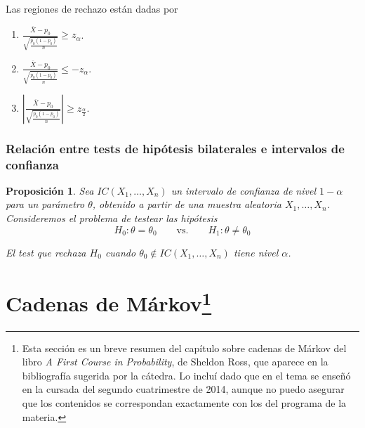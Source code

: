 \documentclass[11pt]{article}
\theoremstyle{plain}
\newtheorem*{pro}{Proposición}
\theoremstyle{definition}
\theoremstyle{remark}
\renewcommand{\arraystretch}{2}
\begin{document}
        Las regiones de rechazo están dadas por
        \begin{enumerate}
          \item $\displaystyle \frac{\overline{X} - p_0}{\sqrt{\frac{p_0 (1 - p_0)}{n}}} \geq z_\alpha$.
          \item $\displaystyle \frac{\overline{X} - p_0}{\sqrt{\frac{p_0 (1 - p_0)}{n}}} \leq - z_\alpha$.
          \item $\displaystyle \left| \frac{\overline{X} - p_0}{\sqrt{\frac{p_0 (1 - p_0)}{n}}} \right| \geq z_\frac{\alpha}{2}$.
        \end{enumerate}

      \subsubsection{Relación entre tests de hipótesis bilaterales e intervalos de confianza}

        \begin{pro}
          Sea $IC(X_1,\dots,X_n)$ un intervalo de confianza de nivel $1 - \alpha$ para un parámetro $\theta$, obtenido a partir de una muestra aleatoria $X_1,\dots,X_n$. Consideremos el problema de testear las hipótesis
          \[ H_0 : \theta = \theta_0 \qquad \text{vs.} \qquad H_1 : \theta \neq \theta_0 \]

          El test que rechaza $H_0$ cuando $\theta_0 \notin IC(X_1,\dots,X_n)$ tiene nivel $\alpha$.
        \end{pro}

  \section[Cadenas de Márkov]{Cadenas de Márkov\footnote{Esta sección es un breve resumen del capítulo sobre cadenas de Márkov del libro \emph{A First Course in Probability}, de Sheldon Ross, que aparece en la bibliografía sugerida por la cátedra. Lo incluí dado que en el tema se enseñó en la cursada del segundo cuatrimestre de 2014, aunque no puedo asegurar que los contenidos se correspondan exactamente con los del programa de la materia.}}
    \renewcommand{\arraystretch}{1}
\end{document}
